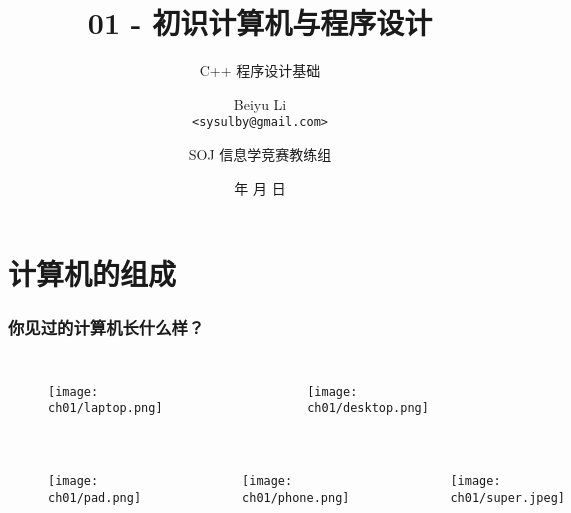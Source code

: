 \title[01 - 初识计算机与程序设计]
{01 - 初识计算机与程序设计}

\subtitle{C++ 程序设计基础}

\author[Beiyu Li]
{Beiyu Li\\
\texttt{<sysulby@gmail.com>}}


\date[\today]
{\number\year 年 \number\month 月 \number\day 日}




\author[sysulby]
{SOJ 信息学竞赛教练组}

\begin{frame}
    \titlepage
\end{frame}
\setcounter{framenumber}{0} %


\section{计算机的组成}

\begin{frame}[fragile]
    \frametitle{你见过的计算机长什么样？}

    \begin{columns}
        \begin{figure}
            \texttt{[image: ch01/laptop.png]}
        \end{figure}

        \begin{figure}
            \texttt{[image: ch01/desktop.png]}
        \end{figure}
    \end{columns}
    \begin{columns}
        \begin{figure}
            \texttt{[image: ch01/pad.png]}
        \end{figure}

        \begin{figure}
            \texttt{[image: ch01/phone.png]}
        \end{figure}

        \begin{figure}
            \texttt{[image: ch01/super.jpeg]}
        \end{figure}
    \end{columns}
\end{frame}


